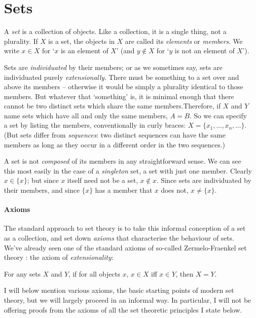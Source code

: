
\section{Sets}

A \emph{set} is a collection of objects. Like a collection, it is a single thing, not a plurality. If $X$ is a set, the objects in $X$ are called its \emph{elements} or \emph{members}. We write $x \in X$ for `$x$ is an element of $X$' (and $y \notin X$ for `$y$ is not an element of $X$').

 Sets are \emph{individuated} by their members; or as we sometimes say, sets are individuated purely \emph{extensionally}. There must be something to a set over and above its members – otherwise it would be simply a plurality identical to those members. But whatever that ‘something’ is, it is minimal enough that there cannot be two distinct sets which share the same members.Therefore, if $X$ and $Y$ name sets which have all and only the same members, $A = B$. So we can specify a set by listing the members, conventionally in curly braces: $X = \{x_{1},...,x_{n},…\}$. (But sets differ from \emph{sequences}: two distinct sequences can have the same members as long as they occur in a different order in the two sequences.)

A set is not \emph{composed} of its members in any straightforward sense. We can see this most easily in the case of a \emph{singleton} set, a set with just one member. Clearly $x \in \{x\}$; but since $x$ itself need not be a set, $x \notin x$. Since sets are individuated by their members, and since $\{x\}$ has a member that $x$ does not, $x\neq\{x\}$.

\paragraph{Axioms} The standard approach to set theory is to take this informal conception of a set as a collection, and set down \emph{axioms} that characterise the behaviour of sets. We've already seen one of the standard axioms of so-called Zermelo-Fraenkel set theory : the axiom of \emph{extensionality}: \begin{axiom}[Extensionality]
  For any sets $X$ and $Y$, if for all objects $x$, $x\in X$ iff $x\in Y$, then $X=Y$.
\end{axiom} I will below mention various axioms, the basic starting points of modern set theory, but we will largely proceed in an informal way. In particular, I will not be offering proofs from the axioms of all the set theoretic principles I state below.


